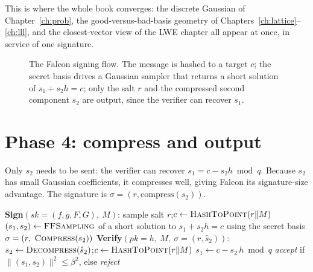 This is where the whole book converges: the discrete Gaussian of Chapter~\ref{ch:prob}, the good-versus-bad-basis geometry of Chapters~\ref{ch:lattice}--\ref{ch:lll}, and the closest-vector view of the LWE chapter all appear at once, in service of one signature.

\begin{figure}[H]
\centering
{}
\caption{The Falcon signing flow. The message is hashed to a target $c$; the secret basis drives a Gaussian sampler that returns a short solution of $s_1+s_2h=c$; only the salt $r$ and the compressed second component $s_2$ are output, since the verifier can recover $s_1$.}
\label{fig:falcon-sign}
\end{figure}

\section{Phase 4: compress and output}

Only $s_2$ needs to be sent: the verifier can recover $s_1 = c - s_2 h \bmod q$. Because $s_2$ has small Gaussian coefficients, it compresses well, giving Falcon its signature-size advantage. The signature is $\sigma = (r, \text{compress}(s_2))$.

\begin{algorithm}[H]
\caption{FN-DSA.Sign / Verify (teaching form)}
\label{alg:fndsa-signverify}
\begin{algorithmic}[1]
\Statex \textbf{Sign}$(sk=(f,g,F,G),\ M)$:
\State sample salt $r$;\quad $c \gets \textsc{HashToPoint}(r\|M)$
\State $(s_1,s_2) \gets \textsc{FFSampling}$ of a short solution to $s_1+s_2h=c$ using the secret basis
\State \Return $\sigma=(r,\ \textsc{Compress}(s_2))$
\Statex
\Statex \textbf{Verify}$(pk=h,\ M,\ \sigma=(r,\hat s_2))$:
\State $s_2 \gets \textsc{Decompress}(\hat s_2)$;\quad $c \gets \textsc{HashToPoint}(r\|M)$
\State $s_1 \gets c - s_2\,h \bmod q$ 
\State \Return \emph{accept} if $\|(s_1,s_2)\|^2 \le \beta^2$, else \emph{reject} 
\end{algorithmic}
\end{algorithm}

